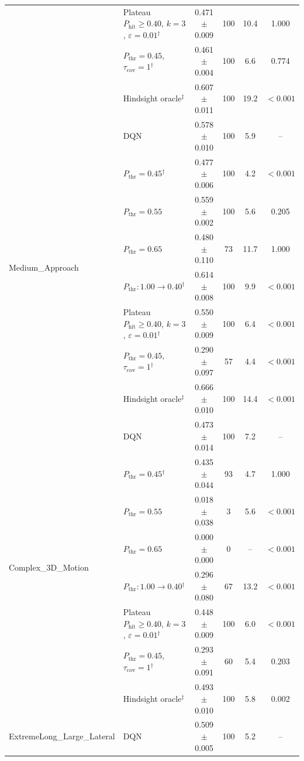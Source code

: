 \begin{table}[htbp]
\begin{tabular}{llcccc}
 & Plateau $P_{\mathrm{hit}}\geq0.40$, $k=3$, $\varepsilon=0.01$$^{\dagger}$ & 0.471 $\pm$ 0.009 & 100 & 10.4 & 1.000 \\
 & $P_{\mathrm{thr}}=0.45$, $\tau_{\mathrm{cov}}=1$$^{\dagger}$ & 0.461 $\pm$ 0.004 & 100 & 6.6 & 0.774 \\
 & Hindsight oracle$^{\ddagger}$ & 0.607 $\pm$ 0.011 & 100 & 19.2 & $<0.001$ \\
\midrule
\multirow{8}{*}{Medium\_Approach} & DQN & 0.578 $\pm$ 0.010 & 100 & 5.9 & -- \\
 & $P_{\mathrm{thr}}=0.45$$^{\dagger}$ & 0.477 $\pm$ 0.006 & 100 & 4.2 & $<0.001$ \\
 & $P_{\mathrm{thr}}=0.55$ & 0.559 $\pm$ 0.002 & 100 & 5.6 & 0.205 \\
 & $P_{\mathrm{thr}}=0.65$ & 0.480 $\pm$ 0.110 & 73 & 11.7 & 1.000 \\
 & $P_{\mathrm{thr}}: 1.00 \to 0.40$$^{\dagger}$ & 0.614 $\pm$ 0.008 & 100 & 9.9 & $<0.001$ \\
 & Plateau $P_{\mathrm{hit}}\geq0.40$, $k=3$, $\varepsilon=0.01$$^{\dagger}$ & 0.550 $\pm$ 0.009 & 100 & 6.4 & $<0.001$ \\
 & $P_{\mathrm{thr}}=0.45$, $\tau_{\mathrm{cov}}=1$$^{\dagger}$ & 0.290 $\pm$ 0.097 & 57 & 4.4 & $<0.001$ \\
 & Hindsight oracle$^{\ddagger}$ & 0.666 $\pm$ 0.010 & 100 & 14.4 & $<0.001$ \\
\midrule
\multirow{8}{*}{Complex\_3D\_Motion} & DQN & 0.473 $\pm$ 0.014 & 100 & 7.2 & -- \\
 & $P_{\mathrm{thr}}=0.45$$^{\dagger}$ & 0.435 $\pm$ 0.044 & 93 & 4.7 & 1.000 \\
 & $P_{\mathrm{thr}}=0.55$ & 0.018 $\pm$ 0.038 & 3 & 5.6 & $<0.001$ \\
 & $P_{\mathrm{thr}}=0.65$ & 0.000 $\pm$ 0.000 & 0 & -- & $<0.001$ \\
 & $P_{\mathrm{thr}}: 1.00 \to 0.40$$^{\dagger}$ & 0.296 $\pm$ 0.080 & 67 & 13.2 & $<0.001$ \\
 & Plateau $P_{\mathrm{hit}}\geq0.40$, $k=3$, $\varepsilon=0.01$$^{\dagger}$ & 0.448 $\pm$ 0.009 & 100 & 6.0 & $<0.001$ \\
 & $P_{\mathrm{thr}}=0.45$, $\tau_{\mathrm{cov}}=1$$^{\dagger}$ & 0.293 $\pm$ 0.091 & 60 & 5.4 & 0.203 \\
 & Hindsight oracle$^{\ddagger}$ & 0.493 $\pm$ 0.010 & 100 & 5.8 & 0.002 \\
\midrule
\multirow{8}{*}{ExtremeLong\_Large\_Lateral} & DQN & 0.509 $\pm$ 0.005 & 100 & 5.2 & -- \\

\end{tabular}
\end{table}
